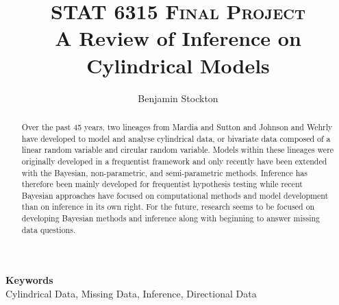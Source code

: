 \documentclass[12pt, letterpaper]{article}
\title{
		\usefont{OT1}{bch}{b}{n}
		\normalfont \normalsize \textsc{STAT 6315 Final Project} \\ [10pt]
		\huge A Review of Inference on Cylindrical Models \\
}
\author[1]{Benjamin Stockton}
\affil[1]{University of Connecticut}
\begin{document}
\maketitle

\begin{abstract}
Over the past 45 years, two lineages from Mardia and Sutton \cite{mardia_model_1978} and Johnson and Wehrly \cite{johnson_angular-linear_1978} have developed to model and analyse cylindrical data, or bivariate data composed of a linear random variable and circular random variable. Models within these lineages were originally developed in a frequentist framework and only recently have been extended with the Bayesian, non-parametric, and semi-parametric methods. Inference has therefore been mainly developed for frequentist hypothesis testing while recent Bayesian approaches have focused on computational methods and model development than on inference in its own right. For the future, research seems to be focused on developing Bayesian methods and inference along with beginning to answer missing data questions. \\ 
\end{abstract} 
{\textbf{Keywords} \\
Cylindrical Data, Missing Data, Inference, Directional Data
}










\end{document}
